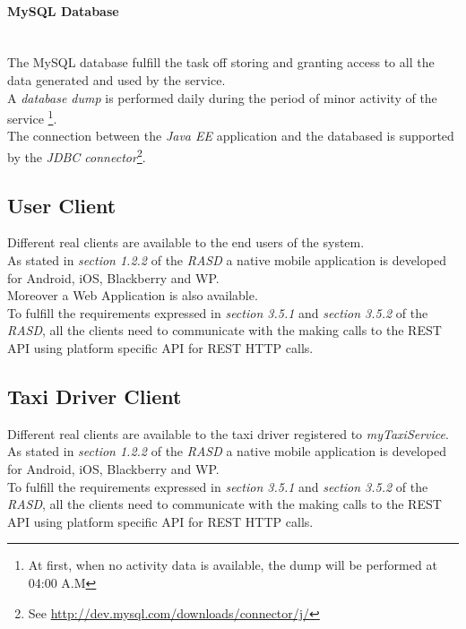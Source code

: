 \paragraph{MySQL Database} %
\label{par:mysql_database}\hfill \\
The MySQL database fulfill the task off storing and granting access to all the data generated and used by the service.\\
A \emph{database dump} is performed daily during the period of minor activity of the service \footnote{At first, when no activity data is available, the dump will be performed at 04:00 A.M}.\\
The connection between the \emph{Java EE} application and the databased is supported by the \emph{JDBC connector}\footnote{See \url{http://dev.mysql.com/downloads/connector/j/}}.\\


\subsection{User Client} %
\label{sub:user_client}
Different real clients are available to the end users of the system.\\
As stated in \emph{section 1.2.2} of the \emph{RASD} a native mobile application is developed for Android, iOS, Blackberry and WP.\\
Moreover a Web Application is also available.\\
To fulfill the requirements expressed in \emph{section 3.5.1} and \emph{section 3.5.2} of the \emph{RASD}, all the clients need to communicate with the  making calls to the REST API using platform specific API for REST HTTP calls.


\subsection{Taxi Driver Client} %
\label{sub:taxi_driver_client}
Different real clients are available to the taxi driver registered to \emph{myTaxiService}.\\
As stated in \emph{section 1.2.2} of the \emph{RASD} a native mobile application is developed for Android, iOS, Blackberry and WP.\\
To fulfill the requirements expressed in \emph{section 3.5.1} and \emph{section 3.5.2} of the \emph{RASD}, all the clients need to communicate with the  making calls to the REST API using platform specific API for REST HTTP calls.
